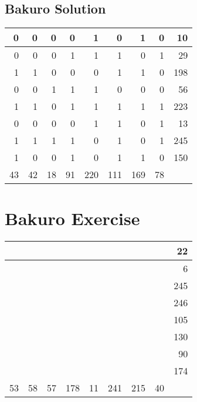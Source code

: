 \documentclass[]{article}
\begin{document}
 \subsection{Bakuro Solution} 
\begin{tabular}{rrrrrrrrr}
\hline
  0 &  0 &  0 &  0 &   1 &   0 &   1 &  0 &  10 \\ \hline
  0 &  0 &  0 &  1 &   1 &   1 &   0 &  1 &  29 \\ \hline
  1 &  1 &  0 &  0 &   0 &   1 &   1 &  0 & 198 \\ \hline
  0 &  0 &  1 &  1 &   1 &   0 &   0 &  0 &  56 \\ \hline
  1 &  1 &  0 &  1 &   1 &   1 &   1 &  1 & 223 \\ \hline
  0 &  0 &  0 &  0 &   1 &   1 &   0 &  1 &  13 \\ \hline
  1 &  1 &  1 &  1 &   0 &   1 &   0 &  1 & 245 \\ \hline
  1 &  0 &  0 &  1 &   0 &   1 &   1 &  0 & 150 \\ \hline
 43 & 42 & 18 & 91 & 220 & 111 & 169 & 78 &     \\ \hline
\hline
\end{tabular}\newpage\section{Bakuro Exercise}\begin{tabular}{rrrrrrrrr}
\hline
    &    &    &     &    &     &     &    &  22 \\ \hline
    &    &    &     &    &     &     &    &   6 \\ \hline
    &    &    &     &    &     &     &    & 245 \\ \hline
    &    &    &     &    &     &     &    & 246 \\ \hline
    &    &    &     &    &     &     &    & 105 \\ \hline
    &    &    &     &    &     &     &    & 130 \\ \hline
    &    &    &     &    &     &     &    &  90 \\ \hline
    &    &    &     &    &     &     &    & 174 \\ \hline
 53 & 58 & 57 & 178 & 11 & 241 & 215 & 40 &     \\ \hline
\hline
\end{tabular}\newpage 
\end{document}
